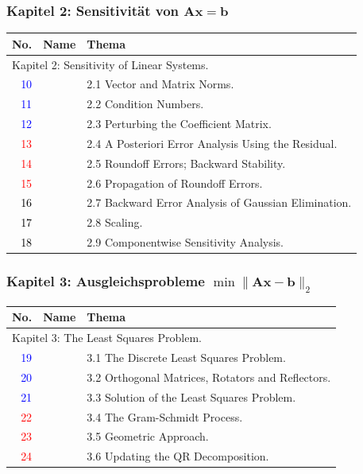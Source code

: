\documentclass[10pt]{beamer} %
\newcommand{\bfA}{{\mathbf A}}
\newcommand{\bfb}{{\mathbf b}}
\newcommand{\bfx}{{\mathbf x}}
\begin{document}
\begin{frame}
  \frametitle{Kapitel 2: Sensitivität von $\bfA\bfx=\bfb$}

  \begin{tabular}{|r|l|l|}\hline
  \textbf{No.} & \textbf{Name} & \textbf{Thema} \\\hline
  \multicolumn{3}{|l|}{Kapitel 2: Sensitivity of Linear Systems.}\\\hline
    \textcolor{blue}{10}&&
  2.1 Vector and Matrix Norms.\\\hline
    \textcolor{blue}{11}&&
  2.2 Condition Numbers.\\\hline
    \textcolor{blue}{12}&&
  2.3 Perturbing the Coefficient Matrix.\\\hline
    \textcolor{red}{13}&&
  2.4 A Posteriori Error Analysis Using the Residual.\\\hline
    \textcolor{red}{14}&&
  2.5 Roundoff Errors; Backward Stability.\\\hline
    \textcolor{red}{15}&&
  2.6 Propagation of Roundoff Errors.\\\hline
    \textcolor{black}{16}&&
  2.7 Backward Error Analysis of Gaussian Elimination.\\\hline
    \textcolor{black}{17}&&
  2.8 Scaling.\\\hline
    \textcolor{black}{18}&&
  2.9 Componentwise Sensitivity Analysis.\\\hline
  \end{tabular}

\end{frame}
\begin{frame}
  \frametitle{Kapitel 3: Ausgleichsprobleme $\min\|\bfA\bfx-\bfb\|_2$}
  
  \begin{tabular}{|r|l|l|}\hline
  \textbf{No.} & \textbf{Name} & \textbf{Thema} \\\hline
  \multicolumn{3}{|l|}{Kapitel 3: The Least Squares Problem.}\\\hline
    \textcolor{blue}{19}&&
  3.1 The Discrete Least Squares Problem.\\\hline
    \textcolor{blue}{20}&&
  3.2 Orthogonal Matrices, Rotators and Reflectors.\\\hline
    \textcolor{blue}{21}&&
  3.3 Solution of the Least Squares Problem.\\\hline
    \textcolor{red}{22}&&
  3.4 The Gram-Schmidt Process.\\\hline
    \textcolor{red}{23}&&
  3.5 Geometric Approach.\\\hline
    \textcolor{red}{24}&&
  3.6 Updating the QR Decomposition.\\\hline
  \end{tabular}

\end{frame}
\end{document}
